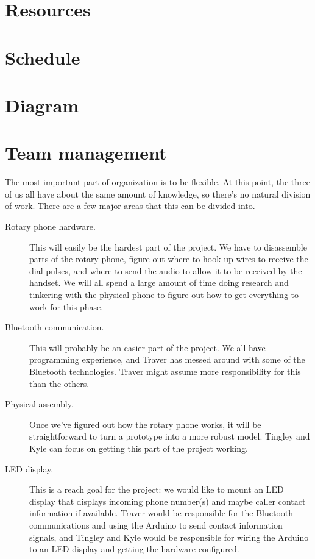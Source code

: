 \documentclass[11pt]{article}
\begin{document}
    \section{Resources}


    \section{Schedule}


    \section{Diagram}


    \section{Team management}
        The most important part of organization is to be flexible. At this point, the three of us all have about the same amount of knowledge, so there's no natural division of work. There are a few major areas that this can be divided into.
        \begin{description}
            \item[Rotary phone hardware.]
                This will easily be the hardest part of the project. We have to disassemble parts of the rotary phone, figure out where to hook up wires to receive the dial pulses, and where to send the audio to allow it to be received by the handset. We will all spend a large amount of time doing research and tinkering with the physical phone to figure out how to get everything to work for this phase.
            \item[Bluetooth communication.]
                This will probably be an easier part of the project. We all have programming experience, and Traver has messed around with some of the Bluetooth technologies. Traver might assume more responsibility for this than the others.
            \item[Physical assembly.]
                Once we've figured out how the rotary phone works, it will be straightforward to turn a prototype into a more robust model. Tingley and Kyle can focus on getting this part of the project working.
            \item[LED display.]
                This is a reach goal for the project: we would like to mount an LED display that displays incoming phone number(s) and maybe caller contact information if available. Traver would be responsible for the Bluetooth communications and using the Arduino to send contact information signals, and Tingley and Kyle would be responsible for wiring the Arduino to an LED display and getting the hardware configured.
        \end{description}
\end{document}
